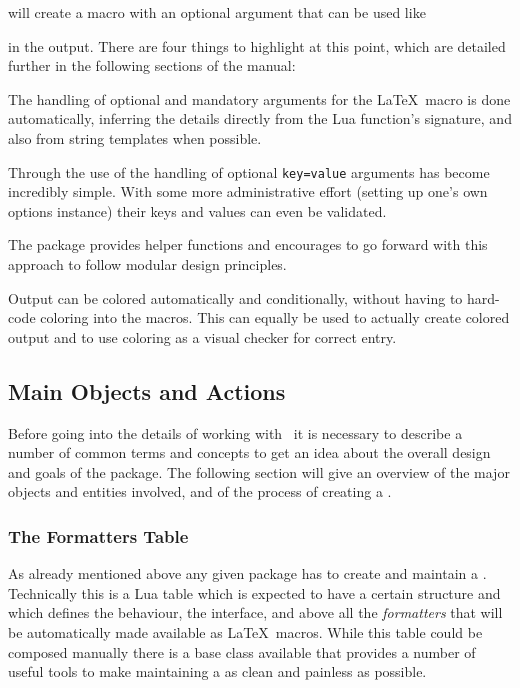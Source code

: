 \documentclass[12pt]{scrartcl}
\begin{document}
\noindent will create a macro  with an optional
argument that can be used like

%
in the output.  There are four things to highlight at this point, which are
detailed further in the following sections of the manual:

\begin{itemize*}
\item The handling of optional and mandatory arguments for the \LaTeX\ macro is
done automatically, inferring the details directly from the Lua function's signature, and also from string templates when possible.
\item Through the use of  the handling of optional
\texttt{key=value} arguments has become incredibly simple.  With some more
administrative effort (setting up one's own options instance) their keys and
values can even be validated.
\item The package provides helper functions and encourages to go forward with
this approach to follow modular design principles.
\item Output can be colored automatically and conditionally, without having to
hard-code coloring into the macros. This can equally be used to actually create
colored output and to use coloring as a visual checker for correct entry.
\end{itemize*}


\subsection{Main Objects and Actions}
\label{sec:main-objects-and-actions}

Before going into the details of working with \luaformatters\ it is
necessary to describe a number of common terms and concepts to get an idea
about the overall design and goals of the package.  The following section will give an overview of the major objects and entities involved, and of the process of creating a .

\subsubsection{The Formatters Table}
\label{sec:intro-the-templates-table}

As already mentioned above any given package has to create and maintain a
.  Technically this is a Lua table which is expected to
have a certain structure and which defines the behaviour, the interface, and
above all the \emph{formatters} that will be automatically made available as
\LaTeX\ macros.  While this table could be composed manually there is a base
class  available that provides a number of useful tools
to make maintaining a  as clean and painless as possible.
\end{document}
